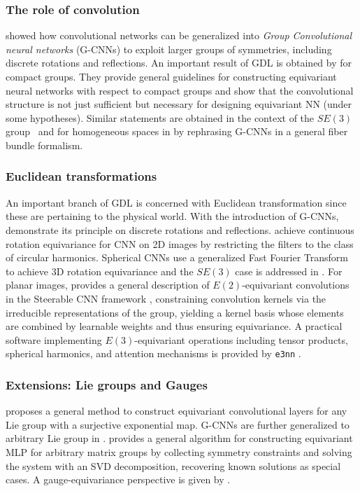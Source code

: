 \documentclass[mathematics,review,submit,moreauthors]{Definitions/mdpi}
\begin{document}
\subsubsection{The role of convolution}
\citet{cohen2016} showed how convolutional networks can be generalized into \textit{Group Convolutional neural networks} (G-CNNs) to exploit larger groups of symmetries, including discrete rotations and reflections.
An important result of GDL is obtained by \citet{kondor2018p3icml} for compact groups.
They provide general guidelines for constructing equivariant neural networks with respect to compact groups and show that the convolutional structure is not just sufficient but necessary for designing equivariant NN (under some hypotheses).
Similar statements are obtained in the context of the $SE(3)$ group~\citep{weiler2018anips} and for homogeneous spaces in \citet{cohen2019anips} by rephrasing G-CNNs in a general fiber bundle formalism.

\subsubsection{Euclidean transformations}
An important branch of GDL is concerned with Euclidean transformation since these are pertaining to the physical world.
With the introduction of G-CNNs, \citet{cohen2016} demonstrate its principle on discrete rotations and reflections.
\citet{worrall2017} achieve continuous rotation equivariance for CNN on 2D images by restricting the filters to the class of circular harmonics.
Spherical CNNs \citep{cohen2018} use a generalized Fast Fourier Transform to achieve $3$D rotation equivariance and the $SE(3)$ case is addressed in \citep{weiler2018anips}.
For planar images, \citet{weiler2019anips} provides a general description of $E(2)$-equivariant convolutions in the Steerable CNN framework \citep{cohen2016a}, constraining convolution kernels via the irreducible representations of the group, yielding a kernel basis whose elements are combined by learnable weights and thus ensuring equivariance.
A practical software implementing $E(3)$-equivariant operations including tensor products, spherical harmonics, and attention mechanisms is provided by \texttt{e3nn} \citep{geiger2022}.

\subsubsection{Extensions: Lie groups and Gauges}
\citet{finzi2020p3icml} proposes a general method to construct equivariant convolutional layers for any Lie group with a surjective exponential map.
G-CNNs are further generalized to arbitrary Lie group in \citep{bekkers2021}.
\citet{finzi2021p3icml} provides a general algorithm for constructing equivariant MLP for arbitrary matrix groups by collecting symmetry constraints and solving the system with an SVD decomposition, recovering known solutions as special cases.
A gauge-equivariance perspective is given by \citep{cohen2019p3icml,gerken2021,weiler2026,boyda2021prd}.
\end{document}
